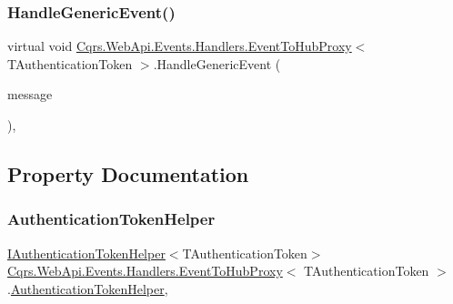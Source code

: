 \subsubsection{\texorpdfstring{Handle\+Generic\+Event()}{HandleGenericEvent()}}
{\footnotesize\ttfamily virtual void \hyperlink{classCqrs_1_1WebApi_1_1Events_1_1Handlers_1_1EventToHubProxy}{Cqrs.\+Web\+Api.\+Events.\+Handlers.\+Event\+To\+Hub\+Proxy}$<$ T\+Authentication\+Token $>$.Handle\+Generic\+Event (\begin{DoxyParamCaption}\item[{\hyperlink{interfaceCqrs_1_1Events_1_1IEvent}{I\+Event}$<$ T\+Authentication\+Token $>$}]{message }\end{DoxyParamCaption})\hspace{0.3cm}{\ttfamily [protected]}, {\ttfamily [virtual]}}



\subsection{Property Documentation}
\mbox{\label{classCqrs_1_1WebApi_1_1Events_1_1Handlers_1_1EventToHubProxy_af5593d8e6bace37fa52545c1f8e65e32_af5593d8e6bace37fa52545c1f8e65e32}} 
\subsubsection{\texorpdfstring{Authentication\+Token\+Helper}{AuthenticationTokenHelper}}
{\footnotesize\ttfamily \hyperlink{interfaceCqrs_1_1Authentication_1_1IAuthenticationTokenHelper}{I\+Authentication\+Token\+Helper}$<$T\+Authentication\+Token$>$ \hyperlink{classCqrs_1_1WebApi_1_1Events_1_1Handlers_1_1EventToHubProxy}{Cqrs.\+Web\+Api.\+Events.\+Handlers.\+Event\+To\+Hub\+Proxy}$<$ T\+Authentication\+Token $>$.\hyperlink{classCqrs_1_1Authentication_1_1AuthenticationTokenHelper}{Authentication\+Token\+Helper}\hspace{0.3cm}{\ttfamily [get]}, {\ttfamily [protected]}}

